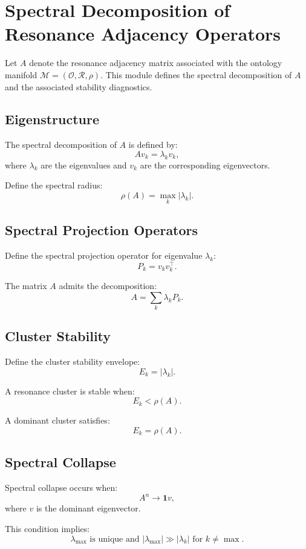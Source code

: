\section{Spectral Decomposition of Resonance Adjacency Operators}

Let $A$ denote the resonance adjacency matrix associated with the ontology
manifold $\mathcal{M} = (\mathcal{O}, \mathcal{R}, \rho)$. This module defines
the spectral decomposition of $A$ and the associated stability diagnostics.

\subsection{Eigenstructure}

The spectral decomposition of $A$ is defined by:
\[
A v_k = \lambda_k v_k,
\]
where $\lambda_k$ are the eigenvalues and $v_k$ are the corresponding
eigenvectors.

Define the spectral radius:
\[
\rho(A) = \max_k |\lambda_k|.
\]

\subsection{Spectral Projection Operators}

Define the spectral projection operator for eigenvalue $\lambda_k$:
\[
P_k = v_k v_k^\top.
\]

The matrix $A$ admits the decomposition:
\[
A = \sum_k \lambda_k P_k.
\]

\subsection{Cluster Stability}

Define the cluster stability envelope:
\[
E_k = |\lambda_k|.
\]

A resonance cluster is stable when:
\[
E_k < \rho(A).
\]

A dominant cluster satisfies:
\[
E_k = \rho(A).
\]

\subsection{Spectral Collapse}

Spectral collapse occurs when:
\[
A^n \to \mathbf{1} v,
\]
where $v$ is the dominant eigenvector.

This condition implies:
\[
\lambda_{\max} \text{ is unique and } |\lambda_{\max}| \gg |\lambda_k| \text{ for } k \ne \max.
\]

